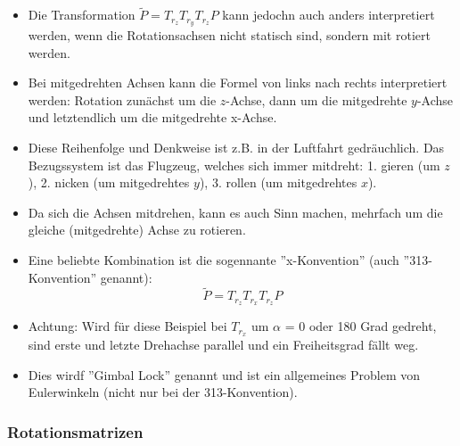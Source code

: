 \documentclass{scrartcl}
\begin{document}
\begin{itemize}
	\item Die Transformation $\widetilde{P} = T_{r_z} T_{r_y} T_{r_z} P$ kann jedochn auch anders interpretiert werden, wenn die Rotationsachsen nicht statisch sind, sondern mit rotiert werden.
	\item Bei mitgedrehten Achsen kann die Formel von links nach rechts interpretiert werden: Rotation zunächst um die $z$-Achse, dann um die mitgedrehte $y$-Achse und letztendlich um die mitgedrehte x-Achse.
	\item Diese Reihenfolge und Denkweise ist z.B. in der Luftfahrt gedräuchlich. Das Bezugssystem ist das Flugzeug, welches sich immer mitdreht: 1. gieren (um $z$), 2. nicken (um mitgedrehtes $y$), 3. rollen (um mitgedrehtes $x$).
	\item Da sich die Achsen mitdrehen, kann es auch Sinn machen, mehrfach um die gleiche (mitgedrehte) Achse zu rotieren.
	\item Eine beliebte Kombination ist die sogennante ''x-Konvention'' (auch ''313-Konvention'' genannt):
	\begin{equation}
		\widetilde{P} = T_{r_z} T_{r_x} T_{r_z} P
	\end{equation}
	\item Achtung: Wird für diese Beispiel bei $T_{r_x}$ um $\alpha$ = 0 oder 180 Grad gedreht, sind erste und letzte Drehachse parallel und ein Freiheitsgrad fällt weg.
	\item Dies wirdf ''Gimbal Lock'' genannt und ist ein allgemeines Problem von Eulerwinkeln (nicht nur bei der 313-Konvention).
\end{itemize}

\subsubsection{Rotationsmatrizen}
\end{document}
